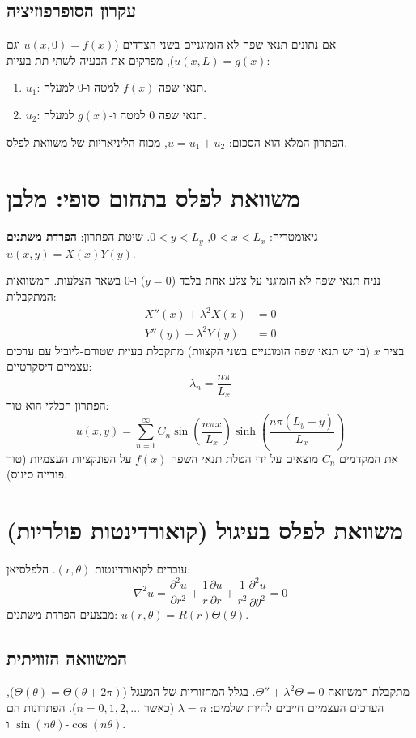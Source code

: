 \documentclass{article}
\begin{document}
\subsection{עקרון הסופרפוזיציה}
אם נתונים תנאי שפה לא הומוגניים בשני הצדדים ($u(x,0)=f(x)$ וגם $u(x,L)=g(x)$), מפרקים את הבעיה לשתי תת-בעיות:
\begin{enumerate}
    \item $u_1$: תנאי שפה $f(x)$ למטה ו-$0$ למעלה.
    \item $u_2$: תנאי שפה $0$ למטה ו-$g(x)$ למעלה.
\end{enumerate}
הפתרון המלא הוא הסכום: $u = u_1 + u_2$, מכוח הליניאריות של משוואת לפלס.

\section{משוואת לפלס בתחום סופי: מלבן}
גיאומטריה: $0 < x < L_x$, $0 < y < L_y$.
שיטת הפתרון: \textbf{הפרדת משתנים} $u(x,y) = X(x)Y(y)$.

נניח תנאי שפה לא הומוגני על צלע אחת בלבד ($y=0$) ו-0 בשאר הצלעות.
המשוואות המתקבלות:
\begin{align}
    X''(x) + \lambda^2 X(x) &= 0 \\
    Y''(y) - \lambda^2 Y(y) &= 0
\end{align}
בציר $x$ (בו יש תנאי שפה הומוגניים בשני הקצוות) מתקבלת בעיית שטורם-ליוביל עם ערכים עצמיים דיסקרטיים:
$$ \lambda_n = \frac{n\pi}{L_x} $$
הפתרון הכללי הוא טור:
\begin{equation}
    u(x,y) = \sum_{n=1}^{\infty} C_n \sin\left(\frac{n\pi x}{L_x}\right) \sinh\left(\frac{n\pi (L_y - y)}{L_x}\right)
\end{equation}
את המקדמים $C_n$ מוצאים על ידי הטלת תנאי השפה $f(x)$ על הפונקציות העצמיות (טור פורייה סינוס).

\section{משוואת לפלס בעיגול (קואורדינטות פולריות)}
עוברים לקואורדינטות $(r, \theta)$. הלפלסיאן:
\begin{equation}
    \nabla^2 u = \frac{\partial^2 u}{\partial r^2} + \frac{1}{r}\frac{\partial u}{\partial r} + \frac{1}{r^2}\frac{\partial^2 u}{\partial \theta^2} = 0
\end{equation}
מבצעים הפרדת משתנים: $u(r,\theta) = R(r)\Theta(\theta)$.

\subsection{המשוואה הזוויתית}
מתקבלת המשוואה $\Theta'' + \lambda^2 \Theta = 0$.
בגלל המחזוריות של המעגל ($\Theta(\theta) = \Theta(\theta + 2\pi)$), הערכים העצמיים חייבים להיות שלמים: $\lambda = n$ (כאשר $n=0,1,2,\dots$).
הפתרונות הם $\sin(n\theta)$ ו-$\cos(n\theta)$.
\end{document}
